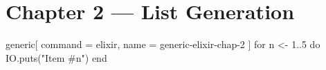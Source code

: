\documentclass[../../example.tex]{subfiles}
\def\exopts{
    command = elixir,
    name    = generic-elixir-chap-2
}
\begin{document}
\section{Chapter 2 — List Generation}

\begin{sciffi}{generic}[\exopts]
  for n <- 1..5 do
    IO.puts("Item #{n}")
  end
\end{sciffi}
\end{document}
